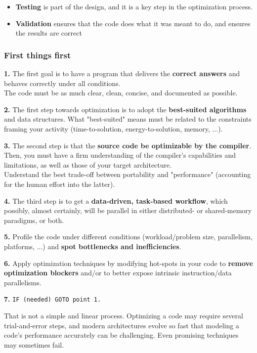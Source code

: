 \begin{itemize}
    \item \textbf{Testing} is part of the design, and it is a key step in the optimization process.
    \item \textbf{Validation} ensures that the code does what it was meant to do, and ensures the results are correct 
\end{itemize}

\newpage
\subsubsection*{First things first}
\textbf{1.} The first goal is to have a program that delivers the \textbf{correct answers} and behaves correctly under all conditions.\\
The code must be as much clear, clean, concise, and documented as possible.

\textbf{2.} The first step towards optimization is to adopt the \textbf{best-suited algorithms} and data structures. What "best-suited" means must be related to the constraints framing your activity (time-to-solution, energy-to-solution, memory, ...).

\textbf{3.} The second step is that the \textbf{source code be optimizable by the compiler}.\\
Then, you must have a firm understanding of the compiler's capabilities and limitations, as well as those of your target architecture.\\
Understand the best trade-off between portability and "performance" (accounting for the human effort into the latter).

\textbf{4.} The third step is to get a \textbf{data-driven, task-based workflow}, which possibly, almost certainly, will be parallel in either distributed- or shared-memory paradigms, or both.

\textbf{5.} Profile the code under different conditions (workload/problem size, parallelism, platforms, ...) and \textbf{spot bottlenecks and inefficiencies}.

\textbf{6.} Apply optimization techniques by modifying hot-spots in your code to \textbf{remove optimization blockers} and/or to better expose intrinsic instruction/data parallelisms.

\textbf{7.} \texttt{IF (needed) GOTO point 1.}

\vspace{1cm}
That is not a simple and linear process. Optimizing a code may require several trial-and-error steps, and modern architectures evolve so fast that modeling a code’s performance accurately can be challenging. Even promising techniques may sometimes fail.

